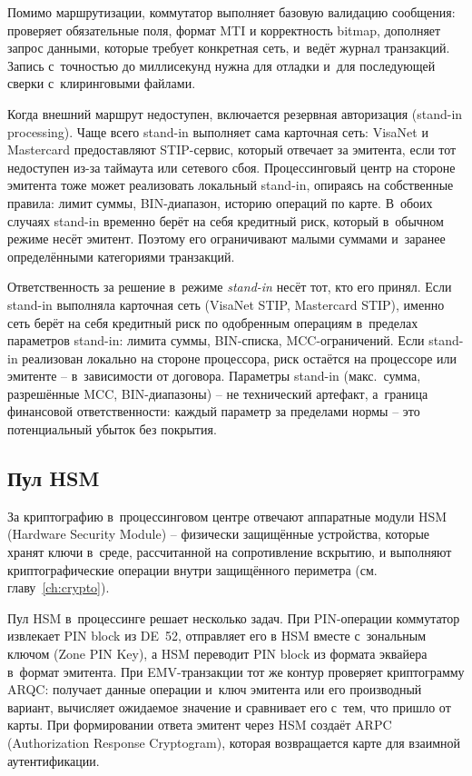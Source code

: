 Помимо маршрутизации, коммутатор выполняет базовую валидацию
сообщения: проверяет обязательные поля, формат MTI
и корректность bitmap, дополняет запрос данными, которые
требует конкретная сеть, и~ведёт журнал транзакций.
Запись с~точностью до миллисекунд нужна для отладки
и~для последующей сверки с~клиринговыми файлами.

Когда внешний маршрут недоступен, включается резервная
авторизация (stand-in processing). Чаще всего stand-in
выполняет сама карточная сеть: VisaNet и Mastercard
предоставляют STIP-сервис, который отвечает за эмитента,
если тот недоступен из-за таймаута или сетевого сбоя.
Процессинговый центр на стороне эмитента тоже может реализовать
локальный stand-in, опираясь на собственные правила: лимит
суммы, BIN-диапазон, историю операций по карте.
В~обоих случаях stand-in временно берёт на себя кредитный риск,
который в~обычном режиме несёт эмитент. Поэтому его ограничивают
малыми суммами и~заранее определёнными категориями
транзакций.~\cite{visa-core-rules,mc-rules}

Ответственность за решение в~режиме \textit{stand-in} несёт тот, кто его принял.
Если stand-in выполняла карточная сеть (VisaNet STIP,
Mastercard STIP), именно сеть берёт на себя кредитный риск
по одобренным операциям в~пределах параметров stand-in:
лимита суммы, BIN-списка, MCC-ограничений. Если stand-in
реализован локально на стороне процессора, риск остаётся
на процессоре или эмитенте -- в~зависимости от договора.
Параметры stand-in (макс.\ сумма, разрешённые MCC, BIN-диапазоны) --
не технический артефакт, а~граница финансовой ответственности:
каждый параметр за пределами нормы -- это потенциальный убыток
без покрытия.

\subsection*{Пул HSM}

За криптографию в~процессинговом центре отвечают
аппаратные модули HSM (Hardware Security Module) --
физически защищённые устройства, которые хранят ключи
в~среде, рассчитанной на сопротивление вскрытию, и выполняют
криптографические операции внутри защищённого периметра
(см. главу~\ref{ch:crypto}).~\cite{pci-pts-hsm,pci-pin-security}

Пул HSM в~процессинге решает несколько задач. При PIN-операции
коммутатор извлекает PIN block из DE~52, отправляет его
в HSM вместе с~зональным ключом (Zone PIN Key), а HSM
переводит PIN block из формата эквайера в~формат эмитента.
При EMV-транзакции тот же контур проверяет криптограмму ARQC:
получает данные операции и~ключ эмитента или его производный
вариант, вычисляет ожидаемое значение и сравнивает его
с~тем, что пришло от карты. При формировании ответа эмитент
через HSM создаёт ARPC (Authorization Response Cryptogram),
которая возвращается карте для взаимной
аутентификации.~\cite{iso-9564,ansi-x9-24,emvco-book2,emvco-book3}

